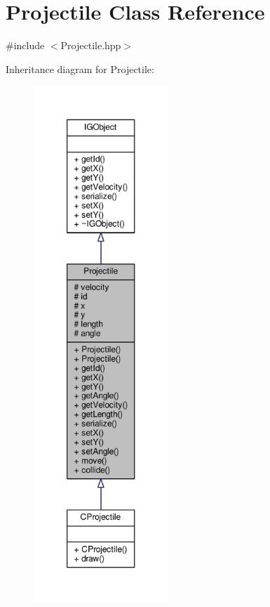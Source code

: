 \hypertarget{class_projectile}{}\section{Projectile Class Reference}
\label{class_projectile}


{\ttfamily \#include $<$Projectile.\+hpp$>$}



Inheritance diagram for Projectile\+:\nopagebreak
\begin{figure}[H]
\begin{center}
\leavevmode
\includegraphics[height=550pt]{class_projectile__inherit__graph}
\end{center}
\end{figure}


